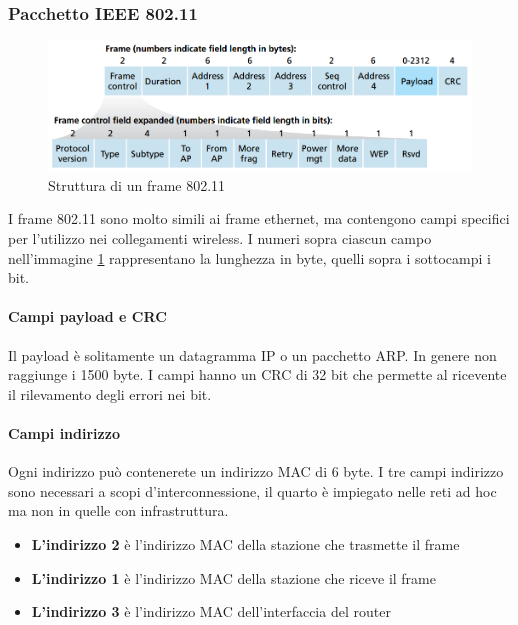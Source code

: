 \documentclass[11pt,a4paper]{article}
\begin{document}
\subsubsection{Pacchetto IEEE 802.11}
\begin{figure}
	\begin{center}
		\includegraphics[scale=0.3]{img/101.png}
		\caption{Struttura di un frame 802.11}
		\label{fig: 101}
	\end{center}
\end{figure}
I frame 802.11 sono molto simili ai frame ethernet, ma contengono campi specifici per l'utilizzo nei collegamenti wireless. I numeri sopra ciascun campo nell'immagine \ref{fig: 101} rappresentano la lunghezza in byte, quelli sopra i sottocampi i bit.
\paragraph{Campi payload e CRC}
Il payload è solitamente un datagramma IP o un pacchetto ARP. In genere non raggiunge i 1500 byte. I campi hanno un CRC di 32 bit che permette al ricevente il rilevamento degli errori nei bit.

\paragraph{Campi indirizzo}
Ogni indirizzo può contenerete un indirizzo MAC di 6 byte. I tre campi indirizzo sono necessari a scopi d'interconnessione, il quarto è impiegato nelle reti ad hoc ma non in quelle con infrastruttura.
\begin{itemize}
	\item \textbf{L'indirizzo 2} è l'indirizzo MAC della stazione che trasmette il frame
	\item \textbf{L'indirizzo 1} è l'indirizzo MAC della stazione che riceve il frame
	\item \textbf{L'indirizzo 3} è l'indirizzo MAC dell'interfaccia del router
\end{itemize}
\end{document}
